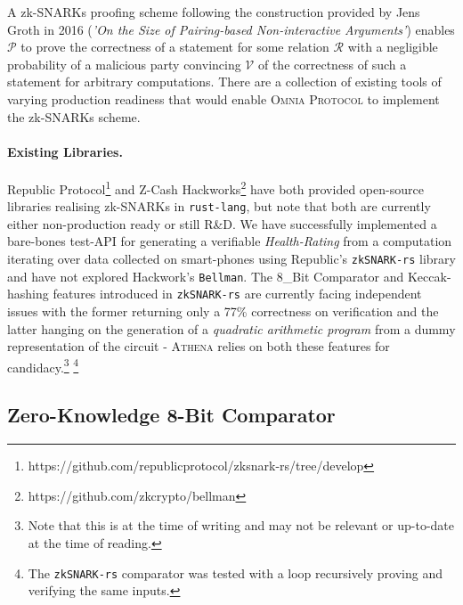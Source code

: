 \documentclass{article}
\begin{document}
			A zk-SNARKs proofing scheme following the construction provided by Jens Groth in 2016 (\textit{'On the Size of Pairing-based Non-interactive Arguments'}) enables $\mathcal{P}$ to prove the correctness of a statement for some relation $\mathcal{R}$ with a negligible probability of a malicious party convincing $\mathcal{V}$ of the correctness of such a statement for arbitrary computations. There are a collection of existing tools of varying production readiness that would enable \textsc{Omnia Protocol} to implement the zk-SNARKs scheme.
			
			\paragraph{Existing Libraries.} Republic Protocol\footnote{https://github.com/republicprotocol/zksnark-rs/tree/develop} and Z-Cash Hackworks\footnote{https://github.com/zkcrypto/bellman} have both provided open-source libraries realising zk-SNARKs in \texttt{rust-lang}, but note that both are currently either non-production ready or still R\&D. We have successfully implemented a bare-bones test-API for generating a verifiable \textit{Health-Rating} from a computation iterating over data collected on smart-phones using Republic's \texttt{zkSNARK-rs} library and have not explored Hackwork's \texttt{Bellman}. The 8\_Bit Comparator and Keccak-hashing features introduced in  \texttt{zkSNARK-rs} are currently facing independent issues with the former returning only a 77\% correctness on verification and the latter hanging on the generation of a \textit{quadratic arithmetic program} from a dummy representation of the circuit - \textsc{Athena} relies on both these features for candidacy.\footnote{Note that this is at the time of writing and may not be relevant or up-to-date at the time of reading.} \footnote{The \texttt{zkSNARK-rs} comparator was tested with a loop recursively proving and verifying the same inputs.}
			
			\subsection{Zero-Knowledge 8-Bit Comparator}
		
\end{document}
